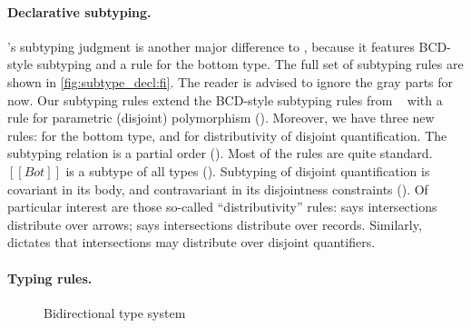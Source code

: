 \paragraph{Declarative subtyping.}

\fnamee's subtyping judgment is another major difference to \fname, because it
features BCD-style subtyping and a rule for the bottom type.
The full set of subtyping rules are shown in
\cref{fig:subtype_decl:fi}. The reader is advised to ignore the gray parts for
now. Our subtyping rules extend the BCD-style subtyping rules from
\namee~\cite{bi_et_al:LIPIcs:2018:9227} with a rule for parametric
(disjoint) polymorphism (). Moreover, we have three new rules:
 for the bottom type, and  for distributivity of
disjoint quantification. The subtyping relation is a partial order
(). Most of the rules are quite standard. $[[Bot]]$ is a subtype of all types ().
Subtyping of disjoint quantification is covariant in its body, and
contravariant in its disjointness constraints (). Of particular interest are those
so-called ``distributivity'' rules:  says intersections
distribute over arrows;  says intersections distribute over
records. Similarly,  dictates that
intersections may distribute over disjoint quantifiers.


\paragraph{Typing rules.}

\begin{figure}[t]
  \centering
  \caption{Bidirectional type system}
  \label{fig:typing:fi}
\end{figure}


